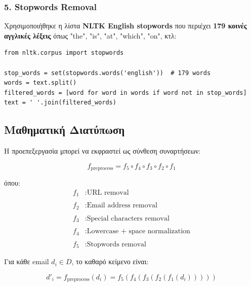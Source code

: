 \documentclass[12pt,a4paper,twoside]{book}
\begin{document}
\subsubsection*{5. Stopwords Removal}

Χρησιμοποιήθηκε η λίστα \textbf{NLTK English stopwords} που περιέχει \textbf{179 κοινές αγγλικές λέξεις} όπως "the", "is", "at", "which", "on", κτλ:

\begin{tcolorbox}[myCustomStyle={Stopwords Removal}]
    \begin{lstlisting}[style=myPythonStyle]
from nltk.corpus import stopwords

stop_words = set(stopwords.words('english'))  # 179 words
words = text.split()
filtered_words = [word for word in words if word not in stop_words]
text = ' '.join(filtered_words)
\end{lstlisting}
\end{tcolorbox}

\subsection{Μαθηματική Διατύπωση}

Η προεπεξεργασία μπορεί να εκφραστεί ως σύνθεση συναρτήσεων:

\begin{equation}
    f_{\text{preprocess}} = f_5 \circ f_4 \circ f_3 \circ f_2 \circ f_1
\end{equation}

όπου:
\begin{align*}
    f_1 & : \text{URL removal}                     \\\\
    f_2 & : \text{Email address removal}           \\\\
    f_3 & : \text{Special characters removal}      \\\\
    f_4 & : \text{Lowercase + space normalization} \\\\
    f_5 & : \text{Stopwords removal}
\end{align*}

Για κάθε email \(d_i \in D\), το καθαρό κείμενο είναι:

\begin{equation}
    d'_i = f_{\text{preprocess}}(d_i) = f_5(f_4(f_3(f_2(f_1(d_i)))))
\end{equation}
\end{document}
